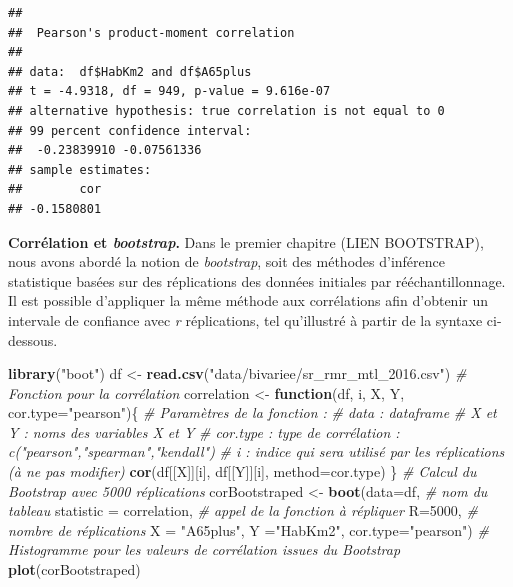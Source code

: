 \documentclass[
  11pt,
  french,
]{book}
\makeatletter
\newenvironment{Shaded}{\begin{snugshade}}{\end{snugshade}}
\newcommand{\CommentTok}[1]{\textcolor[rgb]{0.56,0.35,0.01}{\textit{#1}}}
\newcommand{\ControlFlowTok}[1]{\textcolor[rgb]{0.13,0.29,0.53}{\textbf{#1}}}
\newcommand{\DataTypeTok}[1]{\textcolor[rgb]{0.13,0.29,0.53}{#1}}
\newcommand{\DecValTok}[1]{\textcolor[rgb]{0.00,0.00,0.81}{#1}}
\newcommand{\FloatTok}[1]{\textcolor[rgb]{0.00,0.00,0.81}{#1}}
\newcommand{\KeywordTok}[1]{\textcolor[rgb]{0.13,0.29,0.53}{\textbf{#1}}}
\newcommand{\NormalTok}[1]{#1}
\newcommand{\OperatorTok}[1]{\textcolor[rgb]{0.81,0.36,0.00}{\textbf{#1}}}
\newcommand{\StringTok}[1]{\textcolor[rgb]{0.31,0.60,0.02}{#1}}
\newenvironment{kframe}{%
\medskip{}
\setlength{\fboxsep}{.8em}
 \def\at@end@of@kframe{}%
 \ifinner\ifhmode%
  \def\at@end@of@kframe{\end{minipage}}%
  \begin{minipage}{\columnwidth}%
 \fi\fi%
 \def\FrameCommand##1{\hskip\@totalleftmargin \hskip-\fboxsep
 \colorbox{shadecolor}{##1}\hskip-\fboxsep
     \hskip-\linewidth \hskip-\@totalleftmargin \hskip\columnwidth}%
 \MakeFramed {\advance\hsize-\width
   \@totalleftmargin\z@ \linewidth\hsize
   \@setminipage}}%
 {\par\unskip\endMakeFramed%
 \at@end@of@kframe}
\renewenvironment{Shaded}{\begin{kframe}}{\end{kframe}}
\makeatother
\begin{document}
\begin{Shaded}
\end{Shaded}

\begin{verbatim}
## 
## 	Pearson's product-moment correlation
## 
## data:  df$HabKm2 and df$A65plus
## t = -4.9318, df = 949, p-value = 9.616e-07
## alternative hypothesis: true correlation is not equal to 0
## 99 percent confidence interval:
##  -0.23839910 -0.07561336
## sample estimates:
##        cor 
## -0.1580801
\end{verbatim}

\textbf{Corrélation et \emph{bootstrap}.} Dans le premier chapitre (LIEN BOOTSTRAP), nous avons abordé la notion de \emph{bootstrap}, soit des méthodes d'inférence statistique basées sur des réplications des données initiales par rééchantillonnage. Il est possible d'appliquer la même méthode aux corrélations afin d'obtenir un intervale de confiance avec \emph{r} réplications, tel qu'illustré à partir de la syntaxe ci-dessous.

\begin{Shaded}
\begin{Highlighting}[]
\KeywordTok{library}\NormalTok{(}\StringTok{"boot"}\NormalTok{)}
\NormalTok{df <-}\StringTok{ }\KeywordTok{read.csv}\NormalTok{(}\StringTok{"data/bivariee/sr_rmr_mtl_2016.csv"}\NormalTok{)}
\CommentTok{# Fonction pour la corrélation}
\NormalTok{correlation <-}\StringTok{ }\ControlFlowTok{function}\NormalTok{(df, i, X, Y, }\DataTypeTok{cor.type=}\StringTok{"pearson"}\NormalTok{)\{}
  \CommentTok{# Paramètres de la fonction :}
  \CommentTok{# data : dataframe}
  \CommentTok{# X et Y : noms des variables X et Y}
  \CommentTok{# cor.type : type de corrélation : c("pearson","spearman","kendall")}
  \CommentTok{# i : indice qui sera utilisé par les réplications (à ne pas modifier)}
  \KeywordTok{cor}\NormalTok{(df[[X]][i], df[[Y]][i], }\DataTypeTok{method=}\NormalTok{cor.type)}
\NormalTok{\}}
\CommentTok{# Calcul du Bootstrap avec 5000 réplications}
\NormalTok{corBootstraped <-}\StringTok{ }\KeywordTok{boot}\NormalTok{(}\DataTypeTok{data=}\NormalTok{df, }\CommentTok{# nom du tableau}
                     \DataTypeTok{statistic =}\NormalTok{ correlation, }\CommentTok{# appel de la fonction à répliquer }
                     \DataTypeTok{R=}\DecValTok{5000}\NormalTok{, }\CommentTok{# nombre de réplications}
                     \DataTypeTok{X =} \StringTok{"A65plus"}\NormalTok{,}
                     \DataTypeTok{Y =}\StringTok{"HabKm2"}\NormalTok{, }
                     \DataTypeTok{cor.type=}\StringTok{"pearson"}\NormalTok{)}
\CommentTok{# Histogramme pour les valeurs de corrélation issues du Bootstrap}
\KeywordTok{plot}\NormalTok{(corBootstraped)}
\end{Highlighting}
\end{Shaded}
\end{document}
